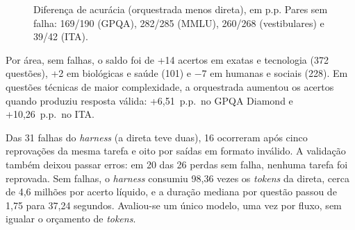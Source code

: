\documentclass[a4paper,10pt, twocolumn]{article}
\begin{document}
\begin{figure}[t]
\centering
\caption{Diferença de acurácia (orquestrada menos direta), em p.p. Pares sem falha: 169/190 (GPQA), 282/285 (MMLU), 260/268 (vestibulares) e 39/42 (ITA).}\label{fig:conjuntos}
\end{figure}

Por área, sem falhas, o saldo foi de +14 acertos em exatas e tecnologia (372 questões), +2 em biológicas e saúde (101) e $-7$ em humanas e sociais (228). Em questões técnicas de maior complexidade, a orquestrada aumentou os acertos quando produziu resposta válida: +6,51~p.p.\ no GPQA Diamond e +10,26~p.p.\ no ITA.

Das 31 falhas do \textit{harness} (a direta teve duas), 16 ocorreram após cinco reprovações da mesma tarefa e oito por saídas em formato inválido. A validação também deixou passar erros: em 20 das 26 perdas sem falha, nenhuma tarefa foi reprovada. Sem falhas, o \textit{harness} consumiu 98,36 vezes os \textit{tokens} da direta, cerca de 4,6 milhões por acerto líquido, e a duração mediana por questão passou de 1,75 para 37,24 segundos. Avaliou-se um único modelo, uma vez por fluxo, sem igualar o orçamento de \textit{tokens}.
\end{document}
